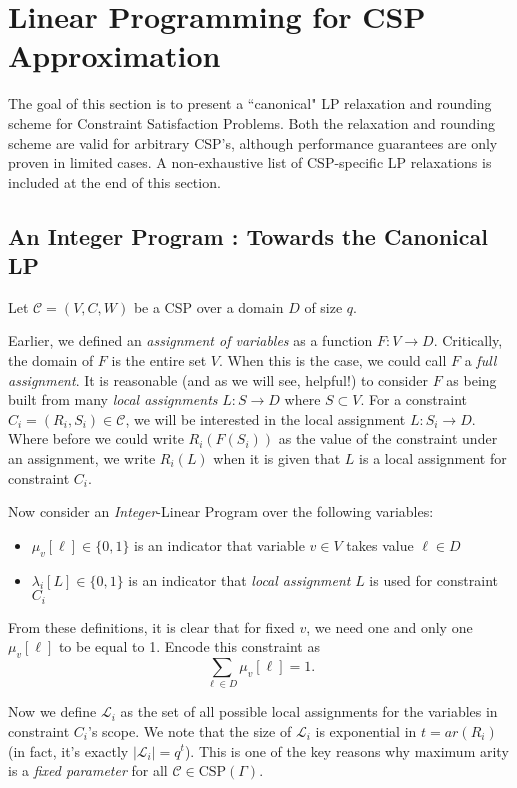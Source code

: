 \section{Linear Programming for CSP Approximation}\label{sec:lpRelax}
The goal of this section is to present a ``canonical" LP relaxation and rounding scheme for Constraint Satisfaction Problems. Both the relaxation and rounding scheme are valid for arbitrary CSP's, although performance guarantees are only proven in limited cases.  A non-exhaustive list of CSP-specific LP relaxations is included at the end of this section.

\subsection{An Integer Program : Towards the Canonical LP }\label{subsec:ip}
Let $\mathcal{C} = (V,C,W)$ be a CSP over a domain $D$ of size $q$.

Earlier, we defined an \textit{assignment of variables} as a function $F : V \to D$. Critically, the domain of $F$ is the entire set $V$. When this is the case, we could call $F$ a \textit{full assignment}. It is reasonable (and as we will see, helpful!) to consider $F$ as being built from many \textit{local assignments} $L : S \to D$ where $S \subset V$. For a constraint $C_i = (R_i,S_i) \in \mathcal{C}$, we will be interested in the local assignment $L : S_i \to D$. Where before we could write $R_i(F(S_i))$ as the value of the constraint under an assignment, we write $R_i(L)$ when it is given that $L$ is a local assignment for constraint $C_i$.

Now consider an \textit{Integer}-Linear Program over the following variables:
\begin{itemize}
\item $\mu_v[\ell] \in \{0,1\}$ is an indicator that variable $v \in V$ takes value $\ell \in D$
\item $\lambda_i[L] \in  \{0,1\}$ is an indicator that \textit{local assignment} $L$ is used for constraint $C_i$
\end{itemize}
From these definitions, it is clear that for fixed $v$, we need one and only one $\mu_v[\ell]$ to be equal to 1. Encode this constraint as 
\begin{equation}\label{musum}
\sum_{\ell \in D} \mu_v[\ell] = 1.
\end{equation}

Now we define $\mathcal{L}_i$ as the set of all possible local assignments for the variables in constraint $C_i$'s scope. We note that the size of $\mathcal{L}_i$ is exponential in $t = ar(R_i)$ (in fact, it's exactly $|\mathcal{L}_i| = q^t$). This is one of the key reasons why maximum arity is a \textit{fixed parameter} for all $\mathcal{C} \in \text{CSP}(\Gamma)$.

